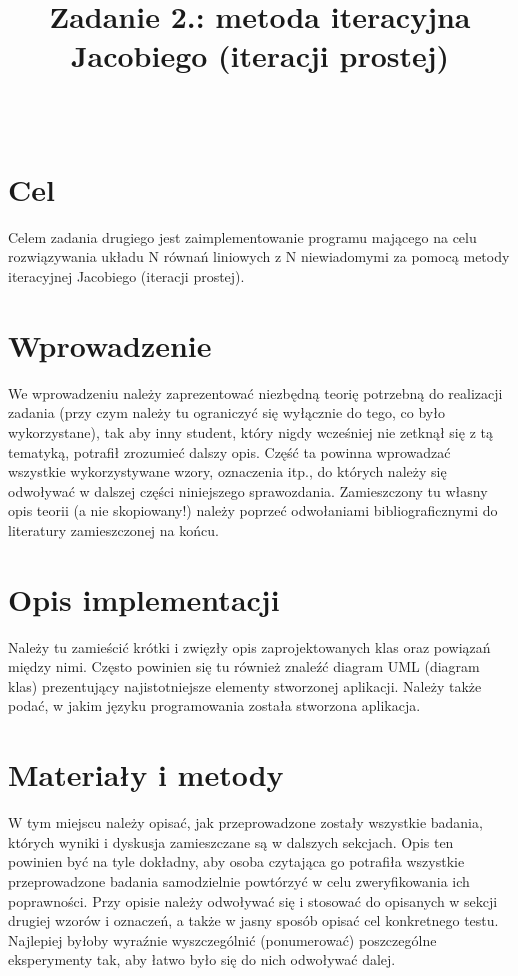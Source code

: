 \documentclass{classrep}
\author{%
  \studentinfo[229963@edu.p.lodz.pl]{Daniel Modrzejewski}{229963}\\
  \studentinfo[230004@edu.p.lodz.pl]{Mateusz Srebnik}{230004}%
}
\title{Zadanie 2.: metoda iteracyjna Jacobiego (iteracji prostej) }
\begin{document}
\maketitle
\thispagestyle{fancyplain}

\section{Cel}
{\color{black}
Celem zadania drugiego jest zaimplementowanie programu mającego na celu  rozwiązywania układu N równań liniowych z N niewiadomymi za pomocą metody iteracyjnej Jacobiego (iteracji prostej).
}

\section{Wprowadzenie}
{\color{blue}
We wprowadzeniu należy zaprezentować niezbędną teorię potrzebną do realizacji
zadania (przy czym należy tu ograniczyć się wyłącznie do tego, co było
wykorzystane), tak aby inny student, który nigdy wcześniej nie zetknął się z tą
tematyką, potrafił zrozumieć dalszy opis. Część ta powinna wprowadzać wszystkie
wykorzystywane wzory, oznaczenia itp., do których należy się odwoływać w
dalszej części niniejszego sprawozdania. Zamieszczony tu własny opis teorii
(a nie skopiowany!) należy poprzeć odwołaniami bibliograficznymi do literatury
zamieszczonej na końcu.}

\section{Opis implementacji}
{\color{blue}
Należy tu zamieścić krótki i zwięzły opis zaprojektowanych klas oraz powiązań
między nimi. Często powinien się tu również znaleźć diagram UML (diagram klas)
prezentujący najistotniejsze elementy stworzonej aplikacji. Należy także podać,
w jakim języku programowania została stworzona aplikacja.}

\section{Materiały i metody}
{\color{blue}
W tym miejscu należy opisać, jak przeprowadzone zostały wszystkie badania,
których wyniki i dyskusja zamieszczane są w dalszych sekcjach. Opis ten
powinien być na tyle dokładny, aby osoba czytająca go potrafiła wszystkie
przeprowadzone badania samodzielnie powtórzyć w celu zweryfikowania ich
poprawności. Przy opisie należy odwoływać się i stosować do
opisanych w sekcji drugiej wzorów i oznaczeń, a także w jasny sposób opisać
cel konkretnego testu. Najlepiej byłoby wyraźnie wyszczególnić (ponumerować)
poszczególne eksperymenty tak, aby łatwo było się do nich odwoływać dalej.}
\end{document}
